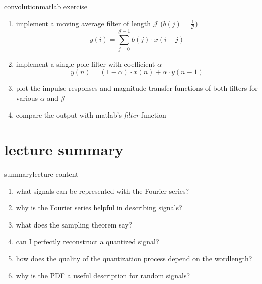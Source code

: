         \begin{frame}{convolution}{matlab exercise}
            
            \begin{enumerate}
                \item   implement a moving average filter of length $\mathcal{J}$ ($b(j) = \frac{1}{\mathcal{J}}$)
                		\begin{equation*}
                            y(i) = \sum\limits_{j=0}^{\mathcal{J}-1}{b(j)\cdot x(i-j)}
                        \end{equation*} 

                \item   implement a single-pole filter with coefficient $\alpha$
                        \begin{equation*}
                            y(n) = (1-\alpha)\cdot x(n) + \alpha\cdot y(n-1)
                        \end{equation*}
                \item   plot the impulse responses and magnitude transfer functions of both filters for various $\alpha$ and $\mathcal{J}$
                \item   compare the output with matlab's \textsl{filter} function
            \end{enumerate}
        \end{frame}
        
    \section[summary]{lecture summary}
        \begin{frame}{summary}{lecture content}
            \begin{enumerate}
                \item       what signals can be represented with the Fourier series?
                \bigskip
                \item<2->   why is the Fourier series helpful in describing signals?
                \bigskip
                \item<3->   what does the sampling theorem say?
                \bigskip
                \item<4->   can I perfectly reconstruct a quantized signal?
                \bigskip
                \item<5->   how does the quality of the quantization process depend on the wordlength?
                \bigskip
                \item<6->   why is the PDF a useful description for random signals?
            \end{enumerate}
        \end{frame}


